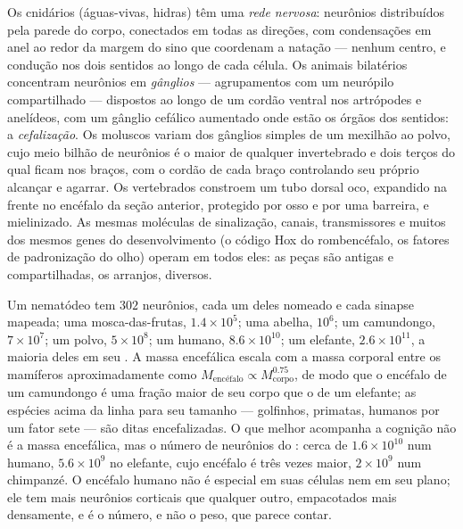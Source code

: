 \begin{definition}\label{def:b3:nervous-systems:comparative}
Os cnidários (águas-vivas, hidras) têm uma \emph{rede nervosa}:
neurônios distribuídos pela parede do corpo, conectados em todas as
direções, com condensações em anel ao redor da margem do sino que
coordenam a natação --- nenhum centro, e condução nos dois sentidos ao
longo de cada célula. Os animais bilatérios concentram neurônios em
\emph{gânglios} --- agrupamentos com um neurópilo compartilhado ---
dispostos ao longo de um cordão ventral nos artrópodes e anelídeos, com
um gânglio cefálico aumentado onde estão os órgãos dos sentidos: a
\emph{cefalização}. Os moluscos variam dos gânglios simples de um
mexilhão ao polvo, cujo meio bilhão de neurônios é o maior de qualquer
invertebrado e dois terços do qual ficam nos braços, com o cordão de
cada braço controlando seu próprio alcançar e agarrar. Os vertebrados
constroem um tubo dorsal oco, expandido na frente no encéfalo da seção
anterior, protegido por osso e por uma barreira, e mielinizado. As
mesmas moléculas de sinalização, canais, transmissores e muitos dos
mesmos genes do desenvolvimento (o código Hox do rombencéfalo, os
fatores de padronização do olho) operam em todos eles: as peças são
antigas e compartilhadas, os arranjos, diversos.
\end{definition}

\begin{example}\label{ex:b3:nervous-systems:counts}
Um nematódeo tem $302$ neurônios, cada um deles nomeado e cada sinapse
mapeada; uma mosca-das-frutas, $1.4\times 10^{5}$; uma abelha,
$10^{6}$; um camundongo, $7\times 10^{7}$; um polvo, $5\times 10^{8}$;
um humano, $8.6\times
10^{10}$; um elefante, $2.6\times 10^{11}$, a
maioria deles em seu . A massa encefálica escala com a massa
corporal entre os mamíferos aproximadamente como $M_{\text{encéfalo}} \propto M_{\text{corpo}}^{0.75}$, de modo que o encéfalo de um camundongo
é uma fração maior de seu corpo que o de um elefante; as espécies acima
da linha para seu tamanho --- golfinhos, primatas, humanos por um fator
sete --- são ditas encefalizadas. O que melhor acompanha a cognição não
é a massa encefálica, mas o número de neurônios do :
cerca de $1.6\times 10^{10}$ num humano, $5.6\times 10^{9}$ no elefante,
cujo encéfalo é três vezes maior, $2\times 10^{9}$ num chimpanzé. O
encéfalo humano não é especial em suas células nem em seu plano; ele tem
mais neurônios corticais que qualquer outro, empacotados mais
densamente, e é o número, e não o peso, que parece contar.
\end{example}

